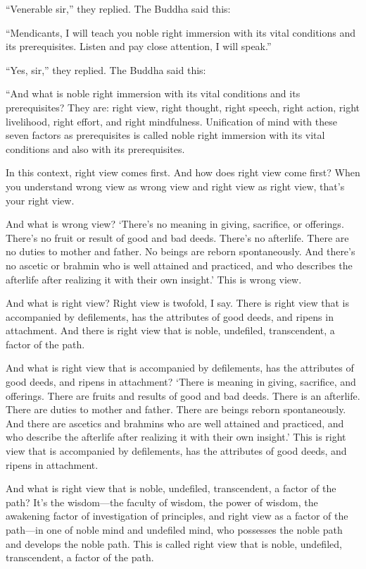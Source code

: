 \documentclass[12pt,openany]{book}%
\begin{document}
“Venerable sir,” they replied. The Buddha said this: 

“Mendicants, I will teach you noble right immersion with its vital conditions and its prerequisites. Listen and pay close attention, I will speak.” 

“Yes, sir,” they replied. The Buddha said this: 

“And what is noble right immersion with its vital conditions and its prerequisites? They are: right view, right thought, right speech, right action, right livelihood, right effort, and right mindfulness. Unification of mind with these seven factors as prerequisites is called noble right immersion with its vital conditions and also with its prerequisites. 

In this context, right view comes first. And how does right view come first? When you understand wrong view as wrong view and right view as right view, that’s your right view. 

And what is wrong view? ‘There’s no meaning in giving, sacrifice, or offerings. There’s no fruit or result of good and bad deeds. There’s no afterlife. There are no duties to mother and father. No beings are reborn spontaneously. And there’s no ascetic or brahmin who is well attained and practiced, and who describes the afterlife after realizing it with their own insight.’ This is wrong view. 

And what is right view? Right view is twofold, I say. There is right view that is accompanied by defilements, has the attributes of good deeds, and ripens in attachment. And there is right view that is noble, undefiled, transcendent, a factor of the path. 

And what is right view that is accompanied by defilements, has the attributes of good deeds, and ripens in attachment? ‘There is meaning in giving, sacrifice, and offerings. There are fruits and results of good and bad deeds. There is an afterlife. There are duties to mother and father. There are beings reborn spontaneously. And there are ascetics and brahmins who are well attained and practiced, and who describe the afterlife after realizing it with their own insight.’ This is right view that is accompanied by defilements, has the attributes of good deeds, and ripens in attachment. 

And what is right view that is noble, undefiled, transcendent, a factor of the path? It’s the wisdom—the faculty of wisdom, the power of wisdom, the awakening factor of investigation of principles, and right view as a factor of the path—in one of noble mind and undefiled mind, who possesses the noble path and develops the noble path. This is called right view that is noble, undefiled, transcendent, a factor of the path. 
\end{document}
